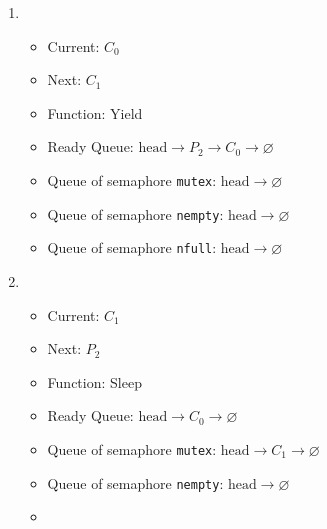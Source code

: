 \documentclass[11pt]{article}
\begin{document}
\begin{question}
\begin{enumerate}
                \item {
                    \begin{itemize}
                        \item{Current: $C_{0}$}
                        \item{Next: $C_{1}$}
                        \item{Function: Yield}
                        \item{
                            Ready Queue: $\text{head}\longrightarrow
                            P_{2}\longrightarrow
                            C_{0}\longrightarrow
                            \varnothing$
                        } \item{
                            Queue of semaphore {\tt mutex}: $\text{head}\longrightarrow
                            \varnothing$
                        }
                        \item{
                            Queue of semaphore {\tt nempty}: $\text{head}\longrightarrow
                            \varnothing$
                        }
                        \item{
                            Queue of semaphore {\tt nfull}: $\text{head}\longrightarrow
                            \varnothing$
                        }
                \end{itemize}}
                \item {
                    \begin{itemize}
                        \item{Current: $C_{1}$}
                        \item{Next: $P_{2}$}
                        \item{Function: Sleep}
                        \item{
                            Ready Queue: $\text{head}\longrightarrow
                            C_{0}\longrightarrow
                            \varnothing$
                        } \item{
                            Queue of semaphore {\tt mutex}: $\text{head}\longrightarrow
                            C_{1}\longrightarrow
                            \varnothing$
                        }
                        \item{
                            Queue of semaphore {\tt nempty}: $\text{head}\longrightarrow
                            \varnothing$
                        }
                        \item{
}
\end{itemize}}
\end{enumerate}
\end{question}
\end{document}
